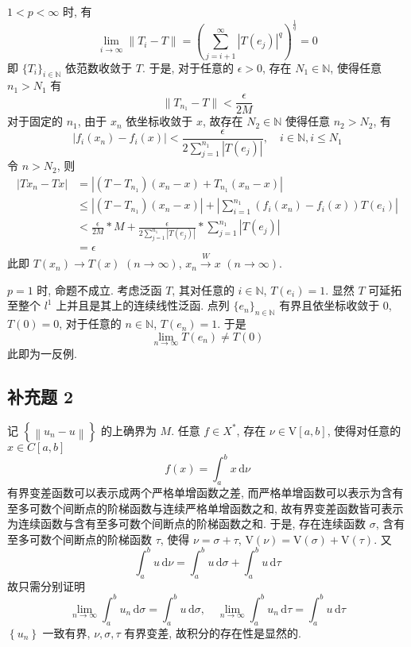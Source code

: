 \documentclass[\ROOT/main.tex]{subfiles}
\begin{document}
$1 < p < \infty$ 时, 有
\[
    \lim_{i \to \infty} \| T_i - T \|
    = \left( \sum_{j = i + 1}^{\infty} \left| T \left( e_j \right) \right|^q \right)^{\frac{1}{q}}
    = 0
\]
即 $\{ T_{i} \}_{i \in \mathbb{N}}$ 依范数收敛于 $T$.
于是, 对于任意的 $\epsilon > 0$, 存在 $N_1 \in \mathbb{N}$, 使得任意 $n_1 > N_1$ 有
\[
    \| T_{n_1} - T \| < \frac{\epsilon}{2 M}
\]
对于固定的 $n_1$, 由于 $x_n$ 依坐标收敛于 $x$, 故存在 $N_2 \in \mathbb{N}$ 使得任意 $n_2 > N_2$, 有
\[
    \left| f_i \left( x_n \right) - f_i \left( x \right) \right|
    < \frac{\epsilon}{2 \sum_{j = 1}^{n_1} \left| T \left( e_j \right) \right|},
    \quad i \in \mathbb{N}, i \leqslant N_1
\]
令 $n > N_2$, 则
\begin{align*}
    \left| T x_n - T x \right|
    &= \left|
        \left( T - T_{n_1} \right) \left( x_n - x \right) + T_{n_1} \left( x_n - x \right)
    \right| \\
    &\leqslant \left|
        \left( T - T_{n_1} \right) \left( x_n - x \right)
    \right|
    + \left|
        \sum_{i = 1}^{n_1} \left( f_i \left( x_n \right) - f_i \left( x \right)  \right) T \left( e_i \right)
    \right| \\
    &< \frac{\epsilon}{2 M} * M
        + \frac{\epsilon}{2 \sum_{j = 1}^{n_1} \left| T \left( e_j \right) \right|} * \sum_{j = 1}^{n_1} \left| T \left( e_j \right) \right| \\
    &= \epsilon
\end{align*}
此即 $T \left( x_n \right) \to T \left( x \right) $ $(n \to \infty)$, $x_n \xrightarrow{W} x$ $(n \to \infty)$.

$p = 1$ 时, 命题不成立.
考虑泛函 $T$, 其对任意的 $i \in \mathbb{N}$, $T \left( e_i \right) = 1$.
显然 $T$ 可延拓至整个 $l^1$ 上并且是其上的连续线性泛函.
点列 $\{ e_{n} \}_{n \in \mathbb{N}}$ 有界且依坐标收敛于 $0$,
$T \left( 0 \right) = 0$, 对于任意的 $n \in \mathbb{N}$, $T \left( e_n \right) = 1$.
于是
\[
    \lim_{n \to \infty} T \left( e_n \right) \neq T \left( 0 \right)
\]
此即为一反例.

\subsection{补充题 2}
记 $\left\{ \left\| u_n - u \right\| \right\}$ 的上确界为 $M$.
任意 $f \in X^*$, 存在 $\nu \in \mathrm{V} [a, b]$, 使得对任意的 $x \in C[a, b]$
\[
    f \left( x \right) = \int_{a}^{b} x \, \mathrm{d} \nu
\]
有界变差函数可以表示成两个严格单增函数之差,
而严格单增函数可以表示为含有至多可数个间断点的阶梯函数与连续严格单增函数之和,
故有界变差函数皆可表示为连续函数与含有至多可数个间断点的阶梯函数之和.
于是, 存在连续函数 $\sigma$, 含有至多可数个间断点的阶梯函数 $\tau$,
使得 $\nu = \sigma + \tau$, $\mathrm{V} \left( \nu \right) = \mathrm{V} \left( \sigma \right) + \mathrm{V} \left( \tau \right)$.
又
\[
    \int_{a}^{b} u \, \mathrm{d} \nu
    = \int_{a}^{b} u \, \mathrm{d} \sigma + \int_{a}^{b} u \, \mathrm{d} \tau
\]
故只需分别证明
\[
    \lim_{n \to \infty} \int_{a}^{b} u_n \, \mathrm{d} \sigma = \int_{a}^{b} u \, \mathrm{d} \sigma
    , \quad
    \lim_{n \to \infty} \int_{a}^{b} u_n \, \mathrm{d} \tau = \int_{a}^{b} u \, \mathrm{d} \tau
\]
$\left\{ u_n \right\}$ 一致有界, $\nu, \sigma, \tau$ 有界变差, 故积分的存在性是显然的.
\end{document}
